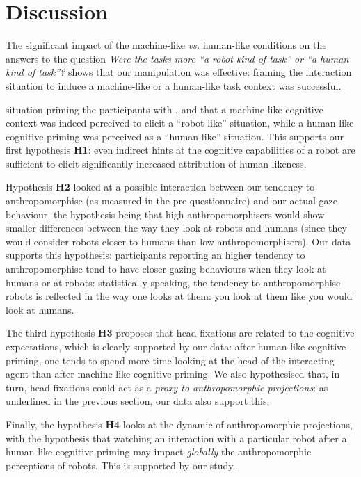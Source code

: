 \documentclass[lettersize, noapacite, twoside, HRI]{apa_HRI}
\newcommand{\vs}{\textit{vs.}\xspace}
\newcommand{\h}[1]{\textbf{H#1}\xspace}
\begin{document}

\section{Discussion}

The significant impact of the machine-like \vs human-like conditions on the
answers to the question \emph{Were the tasks more ``a robot kind of task'' or
``a human kind of task''?} shows that our manipulation was effective: framing
the interaction situation to induce a machine-like or a human-like task context
was successful.

situation priming the participants with , and that a machine-like cognitive
context was indeed perceived to elicit a ``robot-like'' situation, while a
human-like
cognitive priming was perceived as a ``human-like'' situation. This supports our
first hypothesis \h{1}: even indirect hints at the cognitive capabilities of a robot are
sufficient to elicit significantly increased attribution of human-likeness.

Hypothesis \h{2} looked at a possible interaction between our tendency to
anthropomorphise (as measured in the pre-questionnaire) and our actual gaze
behaviour, the hypothesis being that high anthropomorphisers would show smaller
differences between the way they look at robots and humans (since they would
consider robots closer to humans than low anthropomorphisers). Our data supports
this hypothesis: participants reporting an higher tendency to anthropomorphise
tend to have closer gazing behaviours when they look at humans or at robots:
statistically speaking, the tendency to anthropomorphise robots
is reflected in the way one looks at them: you look at them
like you would look at humans.

The third hypothesis \h{3} proposes that head fixations are related to the
cognitive expectations, which is clearly supported by our data: after human-like cognitive
priming, one tends to spend more time looking at the head of the interacting
agent than after machine-like cognitive priming. We also hypothesised that, in turn,
head fixations could act as a \emph{proxy to anthropomorphic projections}: as
underlined in the previous section, our data also support this.

Finally, the hypothesis \h{4} looks at the dynamic of anthropomorphic
projections, with the hypothesis that watching an interaction with a particular
robot after a human-like cognitive priming may impact \emph{globally} the
anthropomorphic perceptions of robots. This is supported by our study.
\end{document}
